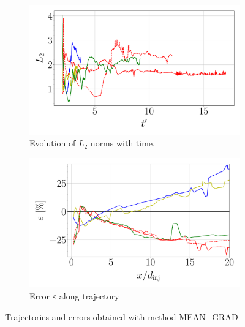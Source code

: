 \begin{figure}[ht]
\begin{subfigure}[b]{0.45\textwidth}
	\centering
   \includegraphics[scale=0.25]{./part2_developments/figures_ch5_resolved_JICF/results_trajectories/methods_expe_validation_L2_evolution.pdf}
   \caption{Evolution of $L_2$ norms with time.}
\end{subfigure}
\hspace{0.25in}
\begin{subfigure}[b]{0.45\textwidth}
	\centering
   \includegraphics[scale=0.25]{./part2_developments/figures_ch5_resolved_JICF/results_trajectories/methods_expe_validation_error_with_xD.pdf}
   \caption{Error $\varepsilon$ along trajectory}
\end{subfigure}

\caption{Trajectories and errors obtained with method MEAN\_GRAD}
\label{fig:JICF_trajectories_validation}
\end{figure}

\clearpage




